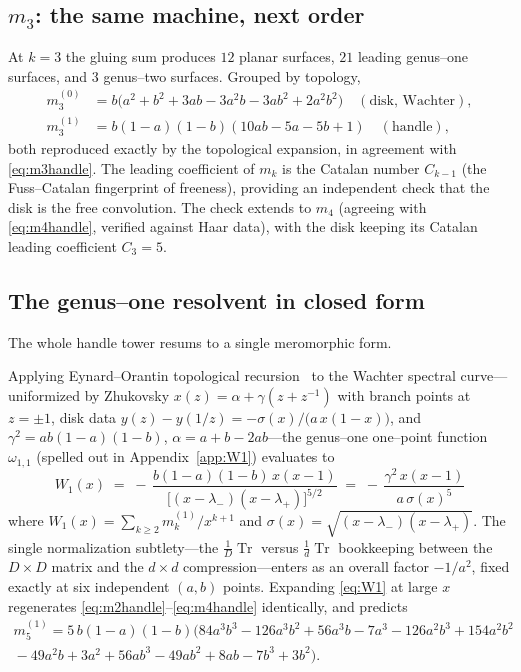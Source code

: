 \documentclass[11pt]{article}
\newcommand{\Tr}{\operatorname{Tr}}
\newif\ifpedagogical
\newcommand{\ped}[1]{\ifpedagogical\par\smallskip{\small\color{pedcol}%
  \leftskip=1.4em\rightskip=1.4em\noindent$\triangleright$~\textit{Plain-language aside.}~#1\par}%
  \par\smallskip\fi}
\begin{document}
\subsection{$m_3$: the same machine, next order}
At $k=3$ the gluing sum produces $12$ planar surfaces, $21$ leading genus--one surfaces, and $3$
genus--two surfaces. Grouped by topology,
\begin{align}
  m_3^{(0)}&=b\big(a^2+b^2+3ab-3a^2b-3ab^2+2a^2b^2\big)\quad(\text{disk, Wachter}),\\
  m_3^{(1)}&=b(1-a)(1-b)(10ab-5a-5b+1)\quad(\text{handle}),
\end{align}
both reproduced exactly by the topological expansion, in agreement with
\eqref{eq:m3handle}. The leading coefficient of $m_k$ is the Catalan number $C_{k-1}$
(the Fuss--Catalan fingerprint of freeness), providing an independent check that the disk is the
free convolution. The check extends to $m_4$ (agreeing with \eqref{eq:m4handle}, verified against
Haar data), with the disk keeping its Catalan leading coefficient $C_3=5$.

\subsection{The genus--one resolvent in closed form}
\label{sec:W1}
The whole handle tower resums to a single meromorphic form.
\ped{Topological recursion, in one breath: it is a machine (Eynard--Orantin) that takes the disk data
of a curve---here the Wachter resolvent $W_0$ and its two branch points---and produces \emph{every}
higher genus term by a fixed residue formula, no new input needed. Below we quote its output for
genus one; Appendix~\ref{app:W1} carries out the residues step by step. ``$\omega_{1,1}$'' is its
name for the genus--one, one--point function, which is just $W_1(x)\,dx$.}
Applying Eynard--Orantin topological
recursion~\cite{EO} to the Wachter spectral curve---uniformized by Zhukovsky
$x(z)=\alpha+\gamma(z+z^{-1})$ with branch points at $z=\pm1$, disk data
$y(z)-y(1/z)=-\sigma(x)/\big(a\,x(1-x)\big)$, and $\gamma^2=ab(1-a)(1-b)$, $\alpha=a+b-2ab$---the
genus--one one--point function $\omega_{1,1}$ (spelled out in Appendix~\ref{app:W1}) evaluates to
\begin{equation}
  \boxed{\;
  W_1(x)\;=\;-\,\frac{b(1-a)(1-b)\,x(x-1)}{\big[(x-\lambda_-)(x-\lambda_+)\big]^{5/2}}
  \;=\;-\,\frac{\gamma^2\,x(x-1)}{a\,\sigma(x)^5}\;}
  \label{eq:W1}
\end{equation}
where $W_1(x)=\sum_{k\ge2}m_k^{(1)}/x^{k+1}$ and $\sigma(x)=\sqrt{(x-\lambda_-)(x-\lambda_+)}$. The
single normalization subtlety---the $\tfrac1D\Tr$ versus $\tfrac1d\Tr$ bookkeeping between the
$D\times D$ matrix and the $d\times d$ compression---enters as an overall factor $-1/a^2$, fixed
exactly at six independent $(a,b)$ points. Expanding \eqref{eq:W1} at large $x$ regenerates
\eqref{eq:m2handle}--\eqref{eq:m4handle} identically, and predicts
\begin{multline}
  m_5^{(1)} = 5\,b(1-a)(1-b)\big(84a^3b^3-126a^3b^2+56a^3b-7a^3-126a^2b^3+154a^2b^2\\
  {}-49a^2b+3a^2+56ab^3-49ab^2+8ab-7b^3+3b^2\big).
\end{multline}
\end{document}
